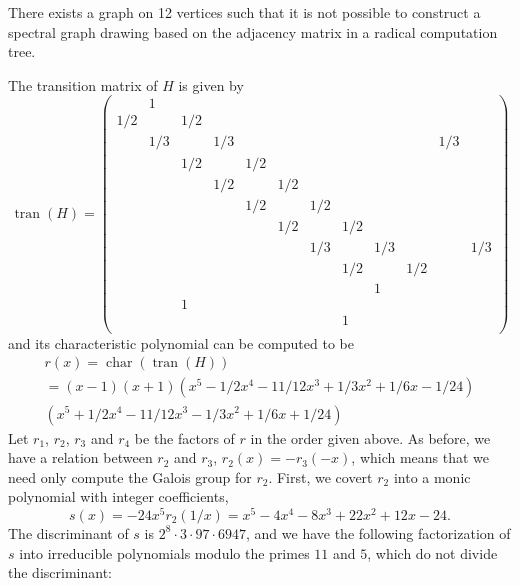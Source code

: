 \documentclass[oribibl,10pt]{llncs}
\DeclareMathOperator{\transition}{tran}
\DeclareMathOperator{\characteristic}{char}
\begin{document}
\begin{appendix}
\begin{theorem}
There exists a graph on 12 vertices such that it is not possible to construct a spectral graph drawing based on the adjacency matrix in a radical computation tree.
\end{theorem}

The transition matrix of $H$ is given by
\[
\transition(H)=
\begin{pmatrix}
   &   1&    &    &    &    &    &    &    &    &    &    \\
1/2&    & 1/2&    &    &    &    &    &    &    &    &    \\
   & 1/3&    & 1/3&    &    &    &    &    &    & 1/3&    \\
   &    & 1/2&    & 1/2&    &    &    &    &    &    &    \\
   &    &    & 1/2&    & 1/2&    &    &    &    &    &    \\
   &    &    &    & 1/2&    & 1/2&    &    &    &    &    \\
   &    &    &    &    & 1/2&    & 1/2&    &    &    &    \\
   &    &    &    &    &    & 1/3&    & 1/3&    &    & 1/3\\
   &    &    &    &    &    &    & 1/2&    & 1/2&    &    \\
   &    &    &    &    &    &    &    &   1&    &    &    \\
   &    &   1&    &    &    &    &    &    &    &    &    \\
   &    &    &    &    &    &    &   1&    &    &    &    \\
\end{pmatrix}
\]
and its characteristic polynomial can be computed to be
\begin{multline*}
r(x) = \characteristic(\transition(H))\\ = (x - 1)   (x + 1)   (x^5 - 1/2 x^4 - 11/12 x^3 + 1/3 x^2 + 1/6 x - 1/24)\\   (x^5 + 1/2 x^4 - 11/12 x^3 - 1/3 x^2 + 1/6 x + 1/24)
\end{multline*}
Let $r_1$, $r_2$, $r_3$ and $r_4$ be the factors of $r$ in the order given above.
As before, we have a relation between $r_2$ and $r_3$, $r_2(x) = -r_3(-x)$, which means that we need only compute the Galois group for $r_2$. First, we covert $r_2$ into a monic polynomial with integer coefficients,
\[
s(x) = -24x^5r_2(1/x) = x^5 - 4x^4 - 8x^3 + 22x^2 +12x - 24.
\]
The discriminant of $s$ is $2^8\cdot 3\cdot 97 \cdot 6947$, and we have the following factorization of $s$ into irreducible polynomials modulo the primes $11$ and $5$, which do not divide the discriminant:

\end{appendix}
\end{document}
